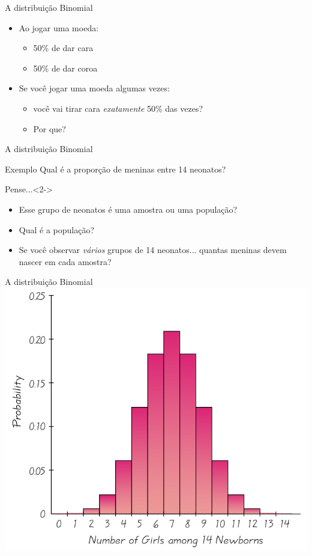 \documentclass{beamer}
\begin{document}
\begin{frame}{A distribuição Binomial}
  \begin{itemize}
  \item Ao jogar uma moeda:
    \begin{itemize}
    \item 50\% de dar cara
    \item 50\% de dar coroa
    \end{itemize}
  \item Se \alert{você} jogar uma moeda  algumas vezes:
    \begin{itemize}
    \item você vai tirar cara {\em exatamente} 50\% das vezes?
    \item Por que?
    \end{itemize}
  \end{itemize}
\end{frame}

\begin{frame}{A distribuição Binomial}
  \begin{exampleblock}{Exemplo}
    Qual é a proporção de meninas entre 14 neonatos?
  \end{exampleblock}
  \begin{block}{Pense...}<2->
    \begin{itemize}
    \item Esse grupo de neonatos é uma amostra ou uma população?
    \item<3-> Qual é a população?
    \item<4-> Se você observar {\em vários} grupos de 14 neonatos... quantas meninas devem nascer em cada amostra?
    \end{itemize}
  \end{block}

\end{frame}

\begin{frame}{A distribuição Binomial}
  \includegraphics[height=\textheight]{Prob_II/discreta}
\end{frame}
\end{document}

